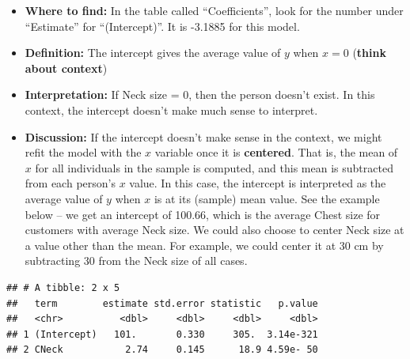 \documentclass[
]{book}
\newenvironment{Shaded}{\begin{snugshade}}{\end{snugshade}}
\newcommand{\DataTypeTok}[1]{\textcolor[rgb]{0.13,0.29,0.53}{#1}}
\newcommand{\KeywordTok}[1]{\textcolor[rgb]{0.13,0.29,0.53}{\textbf{#1}}}
\newcommand{\NormalTok}[1]{#1}
\newcommand{\OperatorTok}[1]{\textcolor[rgb]{0.81,0.36,0.00}{\textbf{#1}}}
\newcommand{\StringTok}[1]{\textcolor[rgb]{0.31,0.60,0.02}{#1}}
\providecommand{\tightlist}{%
  \setlength{\itemsep}{0pt}\setlength{\parskip}{0pt}}
\begin{document}
\begin{itemize}
\tightlist
\item
  \textbf{Where to find:} In the table called ``Coefficients'', look for the number under ``Estimate'' for ``(Intercept)''. It is -3.1885 for this model.
\item
  \textbf{Definition:} The intercept gives the average value of \(y\) when \(x=0\) (\textbf{think about context})
\item
  \textbf{Interpretation:} If Neck size = 0, then the person doesn't exist. In this context, the intercept doesn't make much sense to interpret.
\item
  \textbf{Discussion:} If the intercept doesn't make sense in the context, we might refit the model with the \(x\) variable once it is \textbf{centered}. That is, the mean of \(x\) for all individuals in the sample is computed, and this mean is subtracted from each person's \(x\) value. In this case, the intercept is interpreted as the average value of \(y\) when \(x\) is at its (sample) mean value. See the example below -- we get an intercept of 100.66, which is the average Chest size for customers with average Neck size. We could also choose to center Neck size at a value other than the mean. For example, we could center it at 30 cm by subtracting 30 from the Neck size of all cases.
\end{itemize}

\begin{Shaded}
\end{Shaded}

\begin{verbatim}
## # A tibble: 2 x 5
##   term        estimate std.error statistic   p.value
##   <chr>          <dbl>     <dbl>     <dbl>     <dbl>
## 1 (Intercept)   101.       0.330     305.  3.14e-321
## 2 CNeck           2.74     0.145      18.9 4.59e- 50
\end{verbatim}
\end{document}
